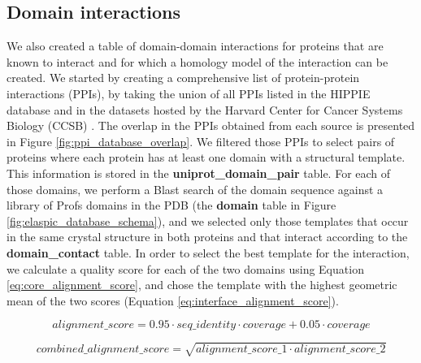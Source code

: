 \subsection{Domain interactions}

We also created a table of domain-domain interactions for proteins that are known to interact and for which a homology model of the interaction can be created. We started by creating a comprehensive list of protein-protein interactions (PPIs), by taking the union of all PPIs listed in the HIPPIE database \cite{schaefer_hippie:_2012} and in the datasets hosted by the Harvard Center for Cancer Systems Biology (CCSB) \cite{rolland_proteome-scale_2014}. The overlap in the PPIs obtained from each source is presented in Figure \ref{fig:ppi_database_overlap}. We filtered those PPIs to select pairs of proteins where each protein has at least one domain with a structural template. This information is stored in the \textbf{uniprot\_domain\_pair} table. For each of those domains, we perform a Blast search of the domain sequence against a library of Profs domains in the PDB (the \textbf{domain} table in Figure \ref{fig:elaspic_database_schema}), and we selected only those templates that occur in the same crystal structure in both proteins and that interact according to the \textbf{domain\_contact} table. In order to select the best template for the interaction, we calculate a quality score for each of the two domains using Equation \ref{eq:core_alignment_score}, and chose the template with the highest geometric mean of the two scores (Equation \ref{eq:interface_alignment_score}).

\begin{equation} \label{eq:core_alignment_score}
	alignment\_score = 0.95 \cdot seq\_identity \cdot coverage + 0.05 \cdot coverage
\end{equation}

\begin{equation} \label{eq:interface_alignment_score}
	combined\_alignment\_score = \sqrt{alignment\_score\_1 \cdot alignment\_score\_2}
\end{equation}


